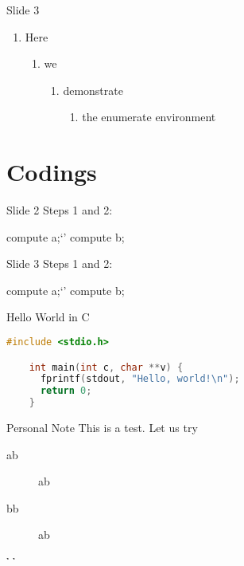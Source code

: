\documentclass[
 size=12pt,
 paper=smartboard, %
 mode=present, %
 display=slides, %
style=tuliplab,
pauseslide,
fleqn,leqno]{powerdot}
\begin{document}
\begin{slide}{Slide 3}
  \begin{enumerate}[type=1]
    \item<1> Here
    \begin{enumerate}
      \item<2> we
      \begin{enumerate}
        \item<3> demonstrate
        \begin{enumerate}
          \item<4> the enumerate environment
        \end{enumerate}
      \end{enumerate}
    \end{enumerate}
  \end{enumerate}
\end{slide}


\section{Codings}

\begin{slide}[method=direct]{Slide 2}
Steps 1 and 2:
\begin{code}
compute a;`\pause'
compute b;
\end{code}
\end{slide}

\begin{slide}[method=file]{Slide 3}
Steps 1 and 2:
\begin{code}
compute a;`\pause'
compute b;
\end{code}
\end{slide}


\begin{slide}[method=direct]{Hello World in C}
  \begin{lstlisting}[language=c,gobble=4]
    #include <stdio.h>

    int main(int c, char **v) {
      fprintf(stdout, "Hello, world!\n");
      return 0;
    }
  \end{lstlisting}
\end{slide}
\begin{note}{Personal Note}
 This is a test. Let us try
\begin{description}
 \item[ab] ab 
 \item[bb] ab 
 \item[bb] ab 
\end{description}
\end{note}
\end{document}
